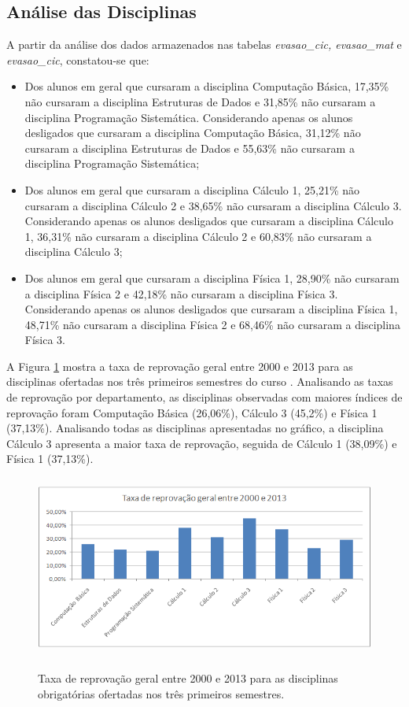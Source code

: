 \subsection{Análise das Disciplinas}

A partir da análise dos dados armazenados nas tabelas \textit{evasao\_cic, evasao\_mat} e \textit{evasao\_cic}, constatou-se que:
\begin{itemize} 
	\item Dos alunos em geral que cursaram a disciplina Computação Básica, 17,35\% não cursaram a disciplina Estruturas de Dados e 31,85\% não cursaram a disciplina Programação Sistemática. Considerando apenas os alunos desligados que cursaram a disciplina Computação Básica, 31,12\% não cursaram a disciplina Estruturas de Dados e 55,63\% não cursaram a disciplina Programação Sistemática;
	\item Dos alunos em geral que cursaram a disciplina Cálculo 1, 25,21\% não cursaram a disciplina Cálculo 2 e 38,65\% não cursaram a disciplina Cálculo 3. Considerando apenas os alunos desligados que cursaram a disciplina Cálculo 1, 36,31\% não cursaram a disciplina Cálculo 2 e 60,83\% não cursaram a disciplina Cálculo 3;
	\item Dos alunos em geral que cursaram a disciplina Física 1, 28,90\% não cursaram a disciplina Física 2 e 42,18\% não cursaram a disciplina Física 3. Considerando apenas os alunos desligados que cursaram a disciplina Física 1, 48,71\% não cursaram a disciplina Física 2 e 68,46\% não cursaram a disciplina Física 3.
\end{itemize}

A Figura \ref{taxa_reprovados} mostra a taxa de reprovação geral entre 2000 e 2013 para as disciplinas ofertadas nos três primeiros semestres do curso . Analisando as taxas de reprovação por departamento, as disciplinas observadas com maiores índices de reprovação foram Computação Básica (26,06\%), Cálculo 3 (45,2\%) e Física 1 (37,13\%). Analisando todas as disciplinas apresentadas no gráfico, a disciplina Cálculo 3 apresenta a maior taxa de reprovação, seguida de Cálculo 1 (38,09\%) e Física 1 (37,13\%).

\begin{figure}[!h]
	\centering
	{\includegraphics[width=13cm, height=6cm]{images/taxa_reprovados}}
	\caption {Taxa de reprovação geral entre 2000 e 2013 para as disciplinas obrigatórias ofertadas nos três primeiros semestres.}
	\label{taxa_reprovados}
\end{figure}

